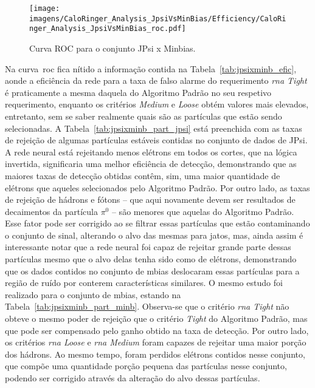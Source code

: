 \begin{figure}[ht]
\centering
\texttt{[image: imagens/CaloRinger\_Analysis\_JpsiVsMinBias/Efficiency/CaloRinger\_Analysis\_JpsiVsMinBias\_roc.pdf]}
\label{fig:jpsixminb_roc}
\caption{Curva ROC para o conjunto JPsi x Minbias.}
\end{figure}

Na curva~\gls{roc} fica nítido a informação contida na
Tabela~\ref{tab:jpsixminb_efic}, aonde a eficiência da rede para a taxa de falso
alarme do requerimento \emph{\gls{rna} Tight} é praticamente a mesma daquela do Algoritmo
Padrão no seu respetivo requerimento, enquanto os critérios \emph{Medium} e
\emph{Loose} obtém valores mais elevados, entretanto, sem se saber realmente
quais são as partículas que estão sendo selecionadas. A
Tabela~\ref{tab:jpsixminb_part_jpsi} está preenchida com as taxas de rejeição de
algumas partículas estáveis contidas no conjunto de dados de JPsi. A rede neural
está rejeitando menos elétrons em todos os cortes, que na lógica invertida, 
significaria uma melhor eficiência de detecção, demonstrando que as maiores taxas
de detecção obtidas contêm, sim, uma maior quantidade de elétrons que aqueles
selecionados pelo Algoritmo Padrão. Por outro lado, as taxas de rejeição de
hádrons e fótons -- que aqui novamente devem ser resultados de decaimentos da
partícula $\pi^0$ -- são menores que aquelas do Algoritmo Padrão. Esse fator
pode ser corrigido ao se filtrar essas partículas que estão contaminando o
conjunto de sinal, alterando o alvo das mesmas para jatos, mas, ainda assim é
interessante notar que a rede neural foi capaz de rejeitar grande parte
dessas partículas mesmo que o alvo delas tenha sido como de elétrons,
demonstrando que os dados contidos no conjunto de \gls{mbias} deslocaram essas
partículas para a região de ruído por conterem características similares. O
mesmo estudo foi realizado para o conjunto de \gls{mbias}, estando na
Tabela~\ref{tab:jpsixminb_part_minb}. Observa-se que o critério \emph{\gls{rna}
Tight} não obteve o mesmo poder de rejeição que o critério \emph{Tight} do
Algoritmo Padrão, mas que pode ser compensado pelo ganho obtido na taxa de
detecção. Por outro lado, os critérios \emph{\gls{rna} Loose} e \emph{\gls{rna} Medium} 
foram capazes de rejeitar uma maior porção dos hádrons. Ao mesmo tempo, foram
perdidos elétrons contidos nesse conjunto, que compõe uma quantidade porção
pequena das partículas nesse conjunto, podendo ser corrigido através da
alteração do alvo dessas partículas.



